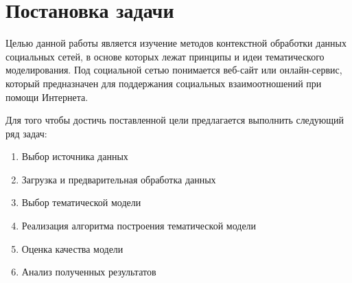 \documentclass[a4paper]{report}
\begin{document}
	\section{Постановка задачи}
	Целью данной работы является изучение методов контекстной обработки данных социальных сетей, в основе которых лежат принципы и идеи тематического моделирования. Под социальной сетью понимается веб-сайт или онлайн-сервис, который предназначен для поддержания социальных взаимоотношений при помощи Интернета. 
	
	 Для того чтобы достичь поставленной цели предлагается выполнить следующий ряд задач:
	
	
	\renewcommand{\labelenumi}{\arabic{enumi}.}
	\renewcommand{\labelenumii}{\arabic{enumi}.\arabic{enumii}}

	\begin{enumerate}
	\item{Выбор источника данных}
	\item{Загрузка и предварительная обработка данных}
	\item{Выбор тематической модели}
	\item{Реализация алгоритма построения тематической модели}
	\item{Оценка качества модели}
	\item{Анализ полученных результатов}
	\end{enumerate}
\end{document}
